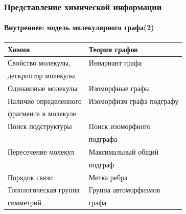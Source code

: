 \begin{frame}
  \frametitle{Представление химической информации}
  \framesubtitle{Внутреннее: модель молекулярного графа(2)}
  \begin{center}
  \begin{tabular}{|m{5cm}|m{5cm}|}
      \hline Химия & Теория графов \\ \hline
      {\color{magenta}Свойство молекулы,} & {\color{orange}Инвариант графа} \\ 
      {\color{magenta}дескриптор молекулы} & \\ \hline
      {\color{magenta}Одинаковые молекулы} & {\color{orange}Изоморфные графы} \\ \hline
      {\color{magenta}Наличие определенного} & {\color{orange}Изоморфизм графа подграфу}  \\
      {\color{magenta}фрагмента в молекуле} & \\ \hline
      {\color{magenta}Поиск подструктуры} & {\color{orange}Поиск изоморфного} \\ & {\color{orange}подграфа} \\ \hline
      {\color{magenta}Пересечение молекул} & {\color{orange}Максимальный общий} \\ & {\color{orange}подграф} \\ \hline
      {\color{magenta}Порядок связи} & {\color{orange}Метка ребра} \\ \hline
      {\color{magenta}Топологическая группа} & {\color{orange}Группа автоморфизмов} \\ 
      {\color{magenta}симметрий} & {\color{orange}графа} \\ \hline
  \end{tabular} 
\end{center}
\end{frame}

